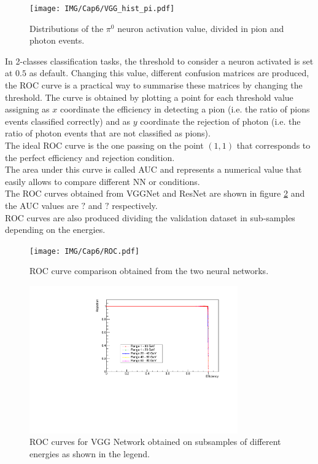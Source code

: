 \begin{figure}
	\centering
	\texttt{[image: IMG/Cap6/VGG\_hist\_pi.pdf]}
	\caption{Distributions of the $\pi^0$ neuron activation value, divided in pion and photon events.}
	\label{fig:VGG_hist_pi}
\end{figure}

In 2-classes classification tasks, the threshold to consider a neuron activated is set at $0.5$ as default. Changing this value, different confusion matrices are produced, the ROC curve is a practical way to summarise these matrices by changing the threshold. The curve is obtained by plotting a point for each threshold value assigning as $x$ coordinate the efficiency in detecting a pion (i.e. the ratio of pions events classified correctly) and as $y$ coordinate the rejection of photon (i.e. the ratio of photon events that are not classified as pions).\\
The ideal ROC curve is the one passing on the point $(1,1)$ that corresponds to the perfect efficiency and rejection condition.\\
The area under this curve is called AUC and represents a numerical value that easily allows to compare different NN or conditions.\\

The ROC curves obtained from VGGNet and ResNet are shown in figure \ref{fig:ROC} and the AUC values are $?$ and $?$ respectively.\\

ROC curves are also produced dividing the validation dataset in sub-samples depending on the energies.

\begin{figure}
	\centering
	\texttt{[image: IMG/Cap6/ROC.pdf]}
	\caption{ROC curve comparison obtained from the two neural networks.}
	\label{fig:ROC}
\end{figure}

\begin{figure}
	\centering
	\includegraphics[width=0.8\textwidth]{IMG/Cap6/ROC_VGG_sub.pdf}
	\caption{ROC curves for VGG Network obtained on subsamples of different energies as shown in the legend.}
	\label{fig:ROC_VGG_sub}
\end{figure}

